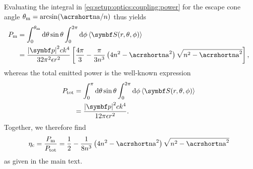 Evaluating the integral in \cref{eq:setup:optics:coupling:power} for the escape cone angle $\theta_{\mr{m}} = \arcsin(\NA/n)$ thus yields
\begin{equation}
    \begin{split}
        P_{\mr{m}} &= \int_{0}^{\theta_{\mr{m}}}\dd{\theta}\sin\theta\int_{0}^{2\pi}\dd{\phi}\expval{\bvec{S}(r, \theta, \phi)} \\
                   &= \frac{\abs{\bvec{p}}^2 c k^4}{32\pi^2\epsilon r^2}\left[\frac{4\pi}{3} - \frac{\pi}{3 n^3} \left(4n^2 - \NA^2\right)\sqrt{n^2 - \NA^2}\right],
    \end{split}
\end{equation}
whereas the total emitted power is the well-known expression
\begin{equation}
    \begin{split}
        P_{\mr{tot}} &= \int_{0}^{\pi}\dd{\theta}\sin\theta\int_{0}^{2\pi}\dd{\phi}\expval{\bvec{S}(r, \theta, \phi)} \\
                     &= \frac{\abs{\bvec{p}}^2 c k^4}{12\pi\epsilon r^2}.
    \end{split}
\end{equation}
Together, we therefore find
\begin{equation}
    \eta_{\mr{c}} = \frac{P_{\mr{m}}}{P_{\mr{tot}}} = \frac{1}{2} - \frac{1}{8 n^3} \left(4n^2 - \NA^2\right)\sqrt{n^2 - \NA^2}
\end{equation}
as given in the main text.

